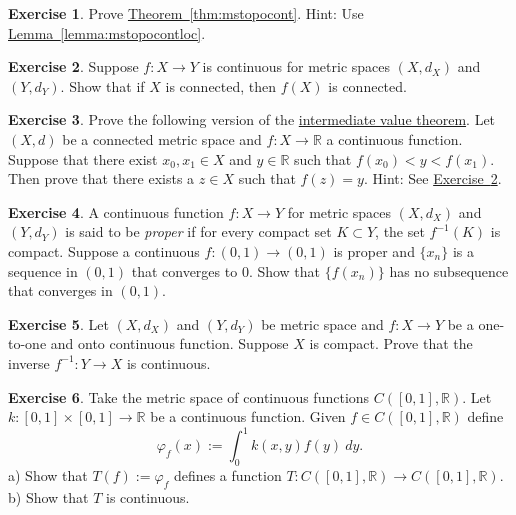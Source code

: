 \documentclass[12pt]{book}
\newcommand{\R}{{\mathbb{R}}}
\newcommand{\myindex}[1]{#1\index{#1}}
\theoremstyle{plain}
\theoremstyle{remark}
\theoremstyle{definition}
\theoremstyle{exercise}
\newtheorem{exercise}{Exercise}[section]
\theoremstyle{example}
\newcommand{\exerciseref}[1]{\hyperref[#1]{Exercise~\ref*{#1}}}
\newcommand{\thmref}[1]{\hyperref[#1]{Theorem~\ref*{#1}}}
\newcommand{\lemmaref}[1]{\hyperref[#1]{Lemma~\ref*{#1}}}
\begin{document}
\begin{exercise}
Prove \thmref{thm:mstopocont}.  Hint: Use \lemmaref{lemma:mstopocontloc}.
\end{exercise}

\begin{exercise} \label{exercise:msconnconn}
Suppose $f \colon X \to Y$ is continuous for metric spaces $(X,d_X)$
and $(Y,d_Y)$.  Show that if $X$ is connected, then $f(X)$ is connected.
\end{exercise}

\begin{exercise}
Prove the following version of the
\hyperref[IVT:thm]{intermediate value theorem}.  Let $(X,d)$ be a connected
metric space and $f \colon X \to \R$ a continuous function.  Suppose that
there exist $x_0,x_1 \in X$ and $y \in \R$ such that $f(x_0) < y < f(x_1)$.
Then prove that there exists a $z \in X$ such that $f(z) = y$.
Hint: See \exerciseref{exercise:msconnconn}.
\end{exercise}

\begin{exercise}
A continuous function $f \colon X \to Y$ for metric spaces $(X,d_X)$ and
$(Y,d_Y)$ is said to be \emph{\myindex{proper}}
if for every compact set $K \subset Y$, the set $f^{-1}(K)$ is compact.
Suppose a continuous $f \colon (0,1) \to (0,1)$ is proper and $\{ x_n
\}$ is a sequence in $(0,1)$ that converges to $0$.  Show that
$\{ f(x_n) \}$ has no subsequence that converges in $(0,1)$.
\end{exercise}

\begin{exercise}
Let $(X,d_X)$ and $(Y,d_Y)$ be metric space and
$f \colon X \to Y$ be a one-to-one and onto continuous function.  Suppose
$X$ is compact.  Prove that the inverse $f^{-1} \colon Y \to X$
is continuous.
\end{exercise}

\begin{exercise}
Take the metric space of continuous functions $C([0,1],\R)$.  Let
$k \colon [0,1] \times [0,1] \to \R$ be a continuous function.
Given $f \in C([0,1],\R)$ define
\begin{equation*}
\varphi_f(x) := \int_0^1 k(x,y) f(y) ~dy .
\end{equation*}
a) Show that $T(f) := \varphi_f$ defines a function $T \colon C([0,1],\R) \to
C([0,1],\R)$.
\\
b) Show that $T$ is continuous.
\end{exercise}
\end{document}
